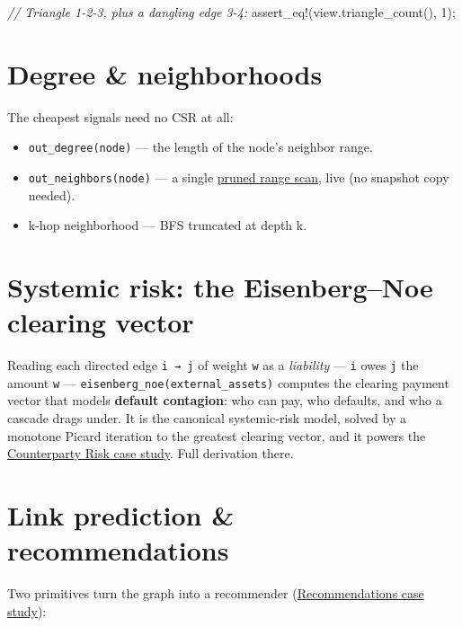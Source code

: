\documentclass[
  11pt,
  openany]{book}
\newenvironment{Shaded}{}{}
\newcommand{\CommentTok}[1]{\textcolor[rgb]{0.38,0.63,0.69}{\textit{#1}}}
\newcommand{\DecValTok}[1]{\textcolor[rgb]{0.25,0.63,0.44}{#1}}
\newcommand{\NormalTok}[1]{#1}
\newcommand{\OperatorTok}[1]{\textcolor[rgb]{0.40,0.40,0.40}{#1}}
\newcommand{\PreprocessorTok}[1]{\textcolor[rgb]{0.74,0.48,0.00}{#1}}
\providecommand{\tightlist}{%
  \setlength{\itemsep}{0pt}\setlength{\parskip}{0pt}}
\begin{document}
\begin{Shaded}
\begin{Highlighting}[]
\CommentTok{// Triangle 1{-}2{-}3, plus a dangling edge 3{-}4:}
\PreprocessorTok{assert\_eq!}\NormalTok{(view}\OperatorTok{.}\NormalTok{triangle\_count()}\OperatorTok{,} \DecValTok{1}\NormalTok{)}\OperatorTok{;}
\end{Highlighting}
\end{Shaded}

\section{Degree \& neighborhoods}\label{degree-neighborhoods}

The cheapest signals need no CSR at all:

\begin{itemize}
\tightlist
\item
  \texttt{out\_degree(node)} --- the length of the node's neighbor
  range.
\item
  \texttt{out\_neighbors(node)} --- a single \href{model.md}{pruned
  range scan}, live (no snapshot copy needed).
\item
  k-hop neighborhood --- BFS truncated at depth k.
\end{itemize}

\section{Systemic risk: the Eisenberg--Noe clearing
vector}\label{systemic-risk-the-eisenbergnoe-clearing-vector}

Reading each directed edge \texttt{i\ →\ j} of weight \texttt{w} as a
\emph{liability} --- \texttt{i} owes \texttt{j} the amount \texttt{w}
--- \texttt{eisenberg\_noe(external\_assets)} computes the clearing
payment vector that models \textbf{default contagion}: who can pay, who
defaults, and who a cascade drags under. It is the canonical
systemic-risk model, solved by a monotone Picard iteration to the
greatest clearing vector, and it powers the
\href{../case-studies/ccr.md}{Counterparty Risk case study}. Full
derivation there.

\section{Link prediction \&
recommendations}\label{link-prediction-recommendations}

Two primitives turn the graph into a recommender
(\href{../case-studies/reco.md}{Recommendations case study}):
\end{document}
